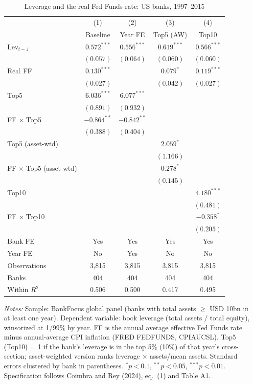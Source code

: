 \begin{table}[htbp]
\centering
\small
\begin{threeparttable}
\caption{Leverage and the real Fed Funds rate: US banks, 1997--2015}
\label{tab:cr_eq1_1}
\begin{tabular}{lcccc}
\toprule
 & (1) & (2) & (3) & (4) \\
 & Baseline & Year FE & Top5 (AW) & Top10 \\
\midrule
Lev$_{t-1}$ & $0.572^{***}$ & $0.556^{***}$ & $0.619^{***}$ & $0.566^{***}$ \\
 & $(0.057)$ & $(0.064)$ & $(0.060)$ & $(0.060)$ \\[2pt]
Real FF & $0.130^{***}$ &  & $0.079^{*}$ & $0.119^{***}$ \\
 & $(0.027)$ &  & $(0.042)$ & $(0.027)$ \\[2pt]
Top5 & $6.036^{***}$ & $6.077^{***}$ &  &  \\
 & $(0.891)$ & $(0.932)$ &  &  \\[2pt]
FF $\times$ Top5 & $-0.864^{**}$ & $-0.842^{**}$ &  &  \\
 & $(0.388)$ & $(0.404)$ &  &  \\[2pt]
Top5 (asset-wtd) &  &  & $2.059^{*}$ &  \\
 &  &  & $(1.166)$ &  \\[2pt]
FF $\times$ Top5 (asset-wtd) &  &  & $0.278^{*}$ &  \\
 &  &  & $(0.145)$ &  \\[2pt]
Top10 &  &  &  & $4.180^{***}$ \\
 &  &  &  & $(0.481)$ \\[2pt]
FF $\times$ Top10 &  &  &  & $-0.358^{*}$ \\
 &  &  &  & $(0.205)$ \\
\midrule
Bank FE & Yes & Yes & Yes & Yes \\
Year FE & No & Yes & No & No \\
Observations & 3,815 & 3,815 & 3,815 & 3,815 \\
Banks & 404 & 404 & 404 & 404 \\
Within $R^2$ & 0.506 & 0.500 & 0.417 & 0.495 \\
\bottomrule
\end{tabular}
\begin{tablenotes}[flushleft]
\footnotesize
\item \textit{Notes:} Sample: BankFocus global panel (banks with total assets $\geq$ USD 10bn in at least one year). Dependent variable: book leverage (total assets / total equity), winsorized at 1/99\% by year. FF is the annual average effective Fed Funds rate minus annual-average CPI inflation (FRED FEDFUNDS, CPIAUCSL). Top5 (Top10) = 1 if the bank's leverage is in the top 5\% (10\%) of that year's cross-section; asset-weighted version ranks leverage $\times$ assets/mean assets. Standard errors clustered by bank in parentheses. $^{*}p<0.1$, $^{**}p<0.05$, $^{***}p<0.01$. Specification follows Coimbra and Rey (2024), eq.~(1) and Table A1.
\end{tablenotes}
\end{threeparttable}
\end{table}
